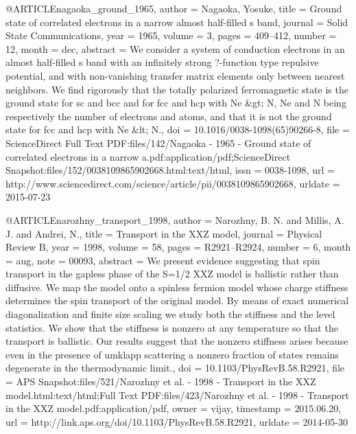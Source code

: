 @ARTICLE{nagaoka_ground_1965,
  author = {Nagaoka, Yosuke},
  title = {Ground state of correlated electrons in a narrow almost half-filled
	s band},
  journal = {Solid State Communications},
  year = {1965},
  volume = {3},
  pages = {409--412},
  number = {12},
  month = dec,
  abstract = {We consider a system of conduction electrons in an almost half-filled
	s band with an infinitely strong ?-function type repulsive potential,
	and with non-vanishing transfer matrix elements only between nearest
	neighbors. We find rigorously that the totally polarized ferromagnetic
	state is the ground state for sc and bcc and for fcc and hcp with
	Ne \&gt; N, Ne and N being respectively the number of electrons and
	atoms, and that it is not the ground state for fcc and hcp with Ne
	\&lt; N.},
  doi = {10.1016/0038-1098(65)90266-8},
  file = {ScienceDirect Full Text PDF:files/142/Nagaoka - 1965 - Ground state of correlated electrons   in a narrow a.pdf:application/pdf;ScienceDirect Snapshot:files/152/0038109865902668.html:text/html},
  issn = {0038-1098},
  url = {http://www.sciencedirect.com/science/article/pii/0038109865902668},
  urldate = {2015-07-23}
}

@ARTICLE{narozhny_transport_1998,
  author = {Narozhny, B. N. and Millis, A. J. and Andrei, N.},
  title = {Transport in the {XXZ} model},
  journal = {Physical Review B},
  year = {1998},
  volume = {58},
  pages = {R2921--R2924},
  number = {6},
  month = aug,
  note = {00093},
  abstract = {We present evidence suggesting that spin transport in the gapless
	phase of the S=1/2 XXZ model is ballistic rather than diffusive.
	We map the model onto a spinless fermion model whose charge stiffness
	determines the spin transport of the original model. By means of
	exact numerical diagonalization and finite size scaling we study
	both the stiffness and the level statistics. We show that the stiffness
	is nonzero at any temperature so that the transport is ballistic.
	Our results suggest that the nonzero stiffness arises because even
	in the presence of umklapp scattering a nonzero fraction of states
	remains degenerate in the thermodynamic limit.},
  doi = {10.1103/PhysRevB.58.R2921},
  file = {APS Snapshot:files/521/Narozhny et al. - 1998 - Transport in the XXZ model.html:text/html;Full Text PDF:files/423/Narozhny et al. - 1998 - Transport in the XXZ model.pdf:application/pdf},
  owner = {vijay},
  timestamp = {2015.06.20},
  url = {http://link.aps.org/doi/10.1103/PhysRevB.58.R2921},
  urldate = {2014-05-30}
}

